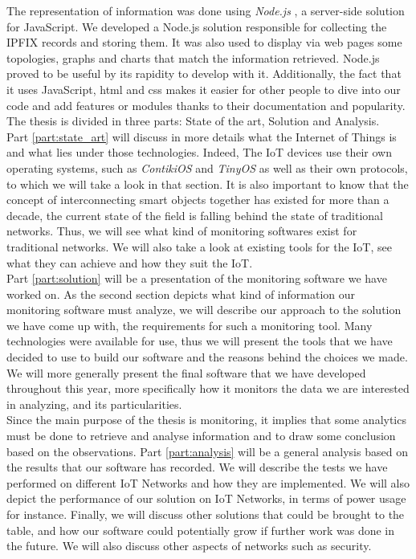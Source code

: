 The representation of information was done using \textit{Node.js} \cite{website:nodejs}, a server-side solution for JavaScript. We developed a Node.js solution responsible for collecting the IPFIX records and storing them. It was also used to display via web pages some topologies, graphs and charts that match the information retrieved. Node.js proved to be useful by its rapidity to develop with it. Additionally, the fact that it uses JavaScript, \acrshort{html} and \acrshort{css} makes it easier for other people to dive into our code and add features or modules thanks to their documentation and popularity. \\

The thesis is divided in three parts: State of the art, Solution and Analysis.\\

Part \ref{part:state_art} will discuss in more details what the Internet of Things is and what lies under those technologies. Indeed, The IoT devices use their own operating systems, such as \textit{ContikiOS} and \textit{TinyOS} as well as their own protocols, to which we will take a look in that section. It is also important to know that the concept of interconnecting smart objects together has existed for more than a decade, the current state of the field is falling behind the state of traditional networks. Thus, we will see what kind of monitoring softwares exist for traditional networks. We will also take a look at existing tools for the IoT, see what they can achieve and how they suit the IoT.\\

Part \ref{part:solution} will be a presentation of the monitoring software we have worked on. As the second section depicts what kind of information our monitoring software must analyze, we will describe our approach to the solution we have come up with, the requirements for such a monitoring tool. Many technologies were available for use, thus we will present the tools that we have decided to use to build our software and the reasons behind the choices we made. We will more generally present the final software that we have developed throughout this year, more specifically how it monitors the data we are interested in analyzing, and its particularities. \\

Since the main purpose of the thesis is monitoring, it implies that some analytics must be done to retrieve and analyse information and to draw some conclusion based on the observations. Part \ref{part:analysis} will be a general analysis based on the results that our software has recorded. We will describe the tests we have performed on different IoT Networks and how they are implemented. We will also depict the performance of our solution on IoT Networks, in terms of power usage for instance. Finally, we will discuss other solutions that could be brought to the table, and how our software could potentially grow if further work was done in the future. We will also discuss other aspects of networks such as security.
